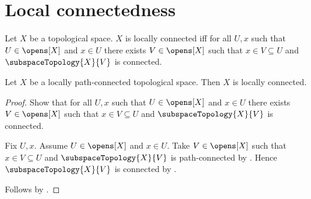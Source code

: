 \section{Local connectedness}





\begin{definition}\label{locally_connected}
    Let $X$ be a topological space.
    $X$ is locally connected iff for all $U,x$ such that
        $U\in\opens[X]$ and $x\in U$ there exists $V\in\opens[X]$ such that
        $x\in V\subseteq U$ and $\subspaceTopology{X}{V}$ is connected.
\end{definition}

\begin{theorem}\label{locally_path_connected_implies_locally_connected}
    Let $X$ be a locally path-connected topological space.
    Then $X$ is locally connected.
\end{theorem}
\begin{proof}
    Show that for all $U,x$ such that $U\in\opens[X]$ and $x\in U$ there exists
        $V\in\opens[X]$ such that $x\in V\subseteq U$ and
        $\subspaceTopology{X}{V}$ is connected.
    \begin{subproof}
        Fix $U,x$.
        Assume $U\in\opens[X]$ and $x\in U$.
        Take $V\in\opens[X]$ such that $x\in V\subseteq U$ and
            $\subspaceTopology{X}{V}$ is path-connected by .
        Hence $\subspaceTopology{X}{V}$ is connected by .
    \end{subproof}
    Follows by .
\end{proof}
